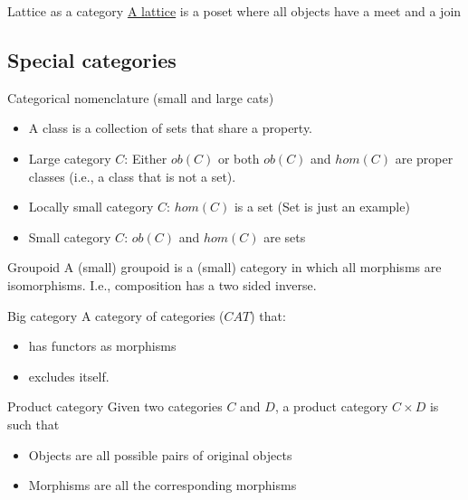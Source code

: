 \documentclass[presentation]{beamer}
\begin{document}
\begin{frame}[label={sec:orge220707}]{Lattice as a category}
\href{https://ncatlab.org/nlab/show/lattice}{A lattice} is a poset where \alert{all objects} have a \alert{meet} and a \alert{join}
\end{frame}

\subsection{Special categories}
\label{sec:org1f87c90}

\begin{frame}[label={sec:org865e0f4}]{Categorical nomenclature (\alert{small} and \alert{large} cats)}
\begin{itemize}
\item A \alert{class} is a collection of sets that share a property.

\item Large category \(C\): Either \(ob(C)\) or both \(ob(C)\) and \(hom(C)\) are proper
classes (i.e., a class that is not a set).

\item Locally small category \(C\): \(hom(C)\) is a set (\alert{Set} is just an example)

\item Small category \(C\): \(ob(C)\) and \(hom(C)\) are sets
\end{itemize}
\end{frame}

\begin{frame}[label={sec:org1c061cc}]{Groupoid}
A (small) \alert{groupoid} is a (small) category in which all morphisms are
\alert{isomorphisms}. I.e., composition has a \alert{two sided inverse}.
\end{frame}

\begin{frame}[label={sec:org690b9ec}]{Big category}
A category of categories (\(CAT\)) that:

\begin{itemize}
\item has functors as morphisms
\item excludes itself.
\end{itemize}
\end{frame}

\begin{frame}[label={sec:org9cfa68d}]{Product category}
Given two categories \(C\) and \(D\), a product category \(C \times D\) is such that

\begin{itemize}
\item Objects are all possible pairs of original objects

\item Morphisms are all the corresponding morphisms
\end{itemize}
\end{frame}
\end{document}
